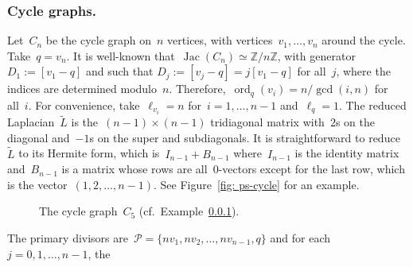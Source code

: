 \documentclass{amsart}
\DeclareMathOperator{\Jac}{Jac}
\DeclareMathOperator{\ord}{ord}
\newcommand{\primary}{\mathcal{P}}
\newcommand{\Z}{\mathbb{Z}}
\newcommand{\tL}{\tilde{L}}
\newcommand{\tl}{\ell}
\begin{document}
\subsubsection{Cycle graphs.}\label{example: ps-cycle} Let~$C_n$ be the cycle graph on~$n$ vertices, with
vertices~$v_1,\dots,v_n$ around the cycle.  Take~$q=v_n$. It is well-known
that~$\Jac(C_n)\simeq\Z/n\Z$, with generator~$D_1:=[v_1-q]$ and such
that $D_j:=[v_{j}-q]=j[v_1-q]$ for all~$j$, where the indices are determined
modulo~$n$.  Therefore,~$\ord_{q}(v_i)=n/\gcd(i,n)$ for all~$i$.  For
convenience, take~$\tl_{v_i}=n$ for~$i=1,\dots,n-1$ and~$\tl_q=1$.  The reduced
Laplacian~$\tL$ is the~$(n-1)\times(n-1)$ tridiagonal matrix with~$2$s on the
diagonal and~$-1$s on the super and subdiagonals.  It is straightforward to
reduce~$\tL$ to its Hermite form, which is~$I_{n-1}+B_{n-1}$ where~$I_{n-1}$ is the
identity matrix and~$B_{n-1}$ is a matrix whose rows are all~$0$-vectors except for
the last row, which is the vector~$(1,2,\dots,n-1)$.  See Figure~\ref{fig:
ps-cycle} for an example.
\begin{figure}[ht]
\centering
{}
\caption{The cycle graph~$C_5$ (cf.~Example~\ref{example: ps-cycle}).}\label{fig: ps-cycle}
\end{figure}
The primary divisors are~$\primary=\{nv_1,nv_2,\dots,nv_{n-1},q\}$ and for
each~$j=0,1,\dots,n-1$, the
\end{document}
